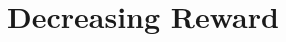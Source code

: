 \documentclass[a4paper,english,cleveref, autoref,numberwithinsect]{lipics-v2019}
\begin{document}
%
%


\section{Decreasing Reward}
\label{sec-dec}

\end{document}
